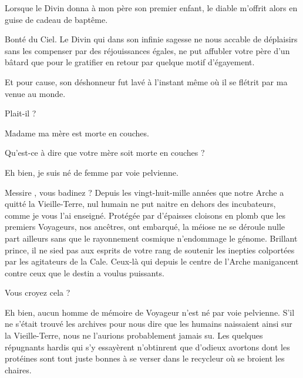 \begin{drama}
  \elenaspeaks Lorsque le Divin donna à mon père son premier enfant, le diable m’offrit alors en guise de cadeau de baptême. %

  \alexasspeaks Bonté du Ciel. Le Divin qui dans son infinie sagesse ne nous accable de déplaisirs sans les compenser par des réjouissances égales,  ne put affubler votre père d’un bâtard que pour le gratifier en retour par quelque motif d’égayement.

  \elenaspeaks Et pour cause, son déshonneur fut lavé à l’instant même où il se flétrit par ma venue au monde.

  \alexasspeaks Plait-il ?

  \elenaspeaks Madame ma mère est morte en couches.

  \alexasspeaks Qu’est-ce à dire que votre mère soit morte en couches ?

  \elenaspeaks Eh bien, je suis né de femme par voie pelvienne. 

  \alexasspeaks Messire \elena, vous badinez  ? %
                Depuis les vingt-huit-mille années que notre Arche a quitté la Vieille-Terre, nul humain ne put naitre en dehors des incubateurs, comme je vous l’ai enseigné. Protégée par d’épaisses cloisons en plomb que les premiers Voyageurs, nos ancêtres, ont embarqué, la méiose ne se déroule nulle part ailleurs sans que le rayonnement cosmique n’endommage le génome. Brillant prince, il ne sied pas aux esprits de votre rang de soutenir les inepties colportées par les agitateurs de la Cale. Ceux-là qui depuis le centre de l’Arche manigancent contre ceux que le destin a voulus puissants.


  \elenaspeaks Vous croyez cela ?


  \alexasspeaks Eh %
   bien, aucun homme de mémoire de Voyageur n’est né par voie pelvienne. S’il ne s’était trouvé les archives pour nous dire que les humains naissaient ainsi sur la Vieille-Terre, nous ne l’aurions probablement jamais su. Les quelques répugnants hardis qui s’y essayèrent n’obtinrent que d’odieux avortons dont les protéines sont tout juste bonnes à se verser dans le recycleur où se broient les chaires.


\end{drama}

